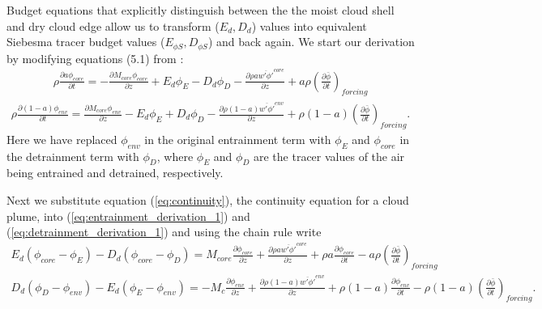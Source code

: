 \documentclass[12pt]{article}
\begin{document}
Budget equations that explicitly distinguish between the the moist
cloud shell and dry cloud edge allow us to transform ($E_d, D_d$)
values into equivalent Siebesma tracer budget values ($E_{\phi S},
D_{\phi S}$) and back again.  We start our derivation by modifying
equations (5.1) from \cite{Siebesma1995}:
\begin{eqnarray}
  \label{eq:entrainment_derivation_1}
    \rho \frac{\partial a \phi_{core}}{\partial t} 
    = - \frac{\partial M_{core} \phi_{core}}{\partial z} 
    + E_d \phi_E - D_d \phi_D
    - \frac{\partial \rho a \overline{w' \phi'}^{core}}{\partial z} 
    + a \rho \left(\frac{\partial \bar{\phi}}{\partial t}\right)_{forcing}
\end{eqnarray}
\begin{eqnarray}
  \label{eq:detrainment_derivation_1}
    \rho \frac{\partial (1 - a) \phi_{env}}{\partial t}
    = \frac{\partial M_{core} \phi_{env}}{\partial z} 
    - E_d \phi_E + D_d \phi_D
    - \frac{\partial \rho (1 - a) \overline{w' \phi'}^{env}}{\partial z} 
    + \rho (1 - a) \left(\frac{\partial \bar{\phi}}{\partial t}\right)_{forcing}.
\end{eqnarray}
Here we have replaced $\phi_{env}$ in the original entrainment term with $\phi_E$ and 
$\phi_{core}$ in the detrainment term with $\phi_D$, where $\phi_E$ and $\phi_D$
are the tracer values of the air being entrained and detrained, respectively.

Next we substitute equation (\ref{eq:continuity}), the continuity equation 
for a cloud plume, into (\ref{eq:entrainment_derivation_1}) 
and (\ref{eq:detrainment_derivation_1}) and using the chain rule write
\begin{eqnarray}
  \label{eq:entrainment_derivation_2}
    E_d (\phi_{core} - \phi_E) - D_d (\phi_{core} - \phi_D)
    = M_{core} \frac{\partial \phi_{core}}{\partial z}
    + \frac{\partial \rho a \overline{w' \phi'}^{core}}{\partial z} 
    + \rho a \frac{\partial \phi_{core}}{\partial t}
    - a \rho \left(\frac{\partial \bar{\phi}}{\partial t}\right)_{forcing}
\end{eqnarray}
\begin{eqnarray}
  \label{eq:detrainment_derivation_2}
    D_d (\phi_D - \phi_{env}) - E_d (\phi_E - \phi_{env})
    = - M_c \frac{\partial \phi_{env}}{\partial z}
    + \frac{\partial \rho (1 - a) \overline{w' \phi'}^{env}}{\partial z} 
    + \rho (1 - a) \frac{\partial \phi_{env}}{\partial t}
    - \rho (1 - a) \left(\frac{\partial \bar{\phi}}{\partial t}\right)_{forcing}.
\end{eqnarray}
\end{document}
